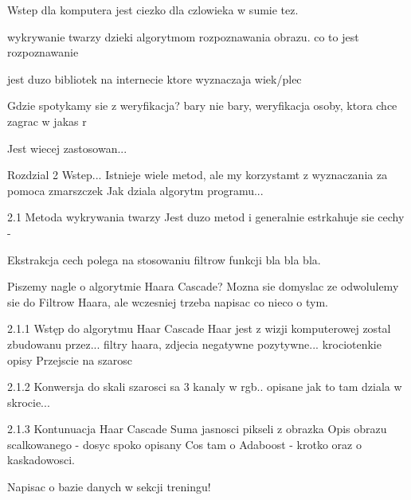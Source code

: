 Wstep
dla komputera jest ciezko dla czlowieka w sumie tez.

wykrywanie twarzy dzieki algorytmom rozpoznawania obrazu. co to jest rozpoznawanie

jest duzo bibliotek na internecie ktore wyznaczaja wiek/plec

Gdzie spotykamy sie z weryfikacja? bary nie bary, weryfikacja osoby, ktora chce zagrac w jakas r

Jest wiecej zastosowan...

Rozdzial 2
Wstep...
Istnieje wiele metod, ale my korzystamt z wyznaczania za pomoca zmarszczek
Jak dziala algorytm programu...

2.1 Metoda wykrywania twarzy
Jest duzo metod i generalnie estrkahuje sie cechy -

Ekstrakcja cech polega na stosowaniu filtrow funkcji bla bla bla.

Piszemy nagle o algorytmie Haara Cascade?
Mozna sie domyslac ze odwolulemy sie do Filtrow Haara, ale wczesniej trzeba napisac co nieco o tym.

2.1.1 Wstęp do algorytmu Haar Cascade
Haar jest z wizji komputerowej zostal zbudowanu przez... filtry haara, zdjecia negatywne pozytywne...
krociotenkie opisy
Przejscie na szarosc %

2.1.2 Konwersja do skali szarosci
sa 3 kanaly w rgb.. opisane jak to tam dziala w skrocie...

2.1.3 Kontunuacja Haar Cascade %
Suma jasnosci pikseli z obrazka
Opis obrazu scalkowanego - dosyc spoko opisany
Cos tam o Adaboost - krotko oraz o kaskadowosci.

Napisac o bazie danych w sekcji treningu!
